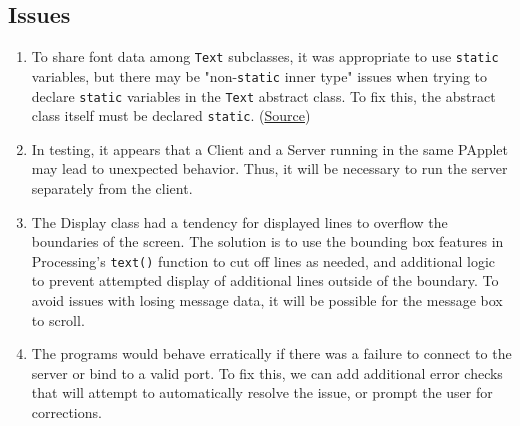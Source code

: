\documentclass{article}
\begin{document}
\subsection{Issues}
\begin{enumerate}
    \item To share font data among \verb|Text| subclasses, it was appropriate to use \verb|static| variables, but there may be "non-\verb|static| inner type" issues when trying to declare \verb|static| variables in the \verb|Text| abstract class. To fix this, the abstract class itself must be declared \verb|static|. (\href{https://forum.processing.org/two/discussion/23623/when-creating-a-class-what-is-it-an-inner-class-of-declared-static-in-a-non-static-inner-type.html}{Source})
    \item In testing, it appears that a Client and a Server running in the same PApplet may lead to unexpected behavior. Thus, it will be necessary to run the server separately from the client.
    \item The Display class had a tendency for displayed lines to overflow the boundaries of the screen. The solution is to use the bounding box features in Processing's \verb|text()| function to cut off lines as needed, and additional logic to prevent attempted display of additional lines outside of the boundary. To avoid issues with losing message data, it will be possible for the message box to scroll.
    \item The programs would behave erratically if there was a failure to connect to the server or bind to a valid port. To fix this, we can add additional error checks that will attempt to automatically resolve the issue, or prompt the user for corrections.
\end{enumerate}
\end{document}
